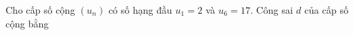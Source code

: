 \begin{ex}
Cho cấp số cộng $(u_n)$ có số hạng đầu $u_1=2$ và $u_6=17$. Công sai $d$ của cấp số cộng bằng
\end{ex}
